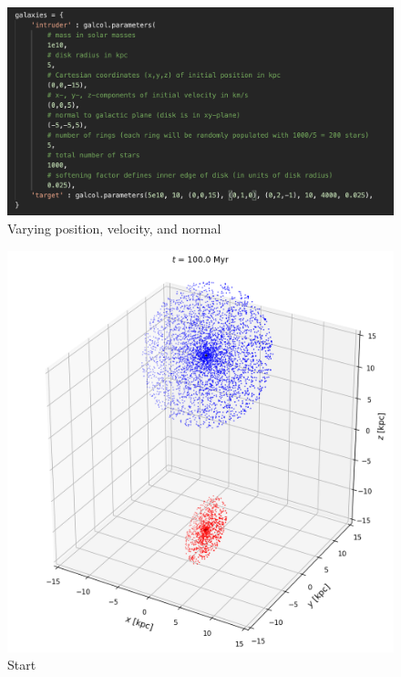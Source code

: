 \documentclass[linenumbers,RNAAS,trackchanges]{aastex631}
\begin{document}
\begin{figure}[H]
    \centering
    \includegraphics[scale=.60]{comparison_galaxy/ARP_42_vars.png}
    \caption{Varying position, velocity, and normal}
    \label{fig:code}
\end{figure}
\newpage
\begin{figure}[H]
    \centering
    \includegraphics[scale=.40]{comparison_galaxy/ARP_42_input.png}
    \caption{Start}
    \label{fig:code}
\end{figure}
\end{document}
